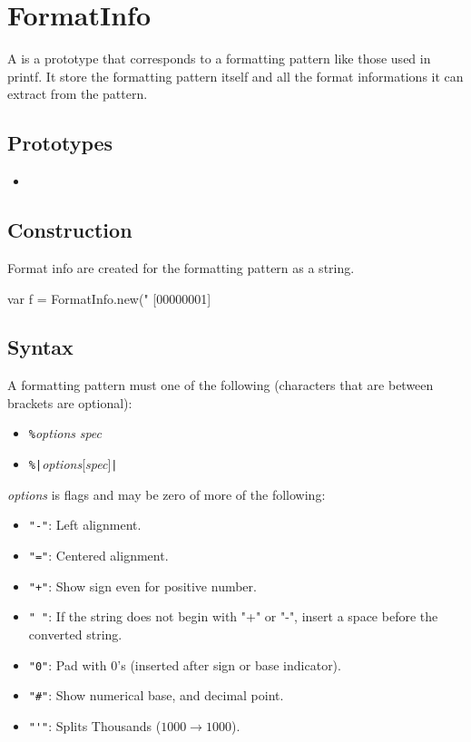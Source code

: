 \section{FormatInfo}

A  is a prototype that corresponds to a formatting
pattern like those used in printf. It store the formatting pattern
itself and all the format informations it can extract from the
pattern.

\subsection{Prototypes}

\begin{itemize}
\item {}
\end{itemize}

\subsection{Construction}

Format info are created for the formatting pattern as a string.

\begin{urbiscript}
var f = FormatInfo.new("%
[00000001] %
\end{urbiscript}

\subsection{Syntax}

A formatting pattern must one of the following (characters that are
between brackets are optional):

\begin{itemize}
\item \verb&%&\emph{options} \emph{spec}
\item \verb&%|&\emph{options}[\emph{spec}]\verb&|&
\end{itemize}

\emph{options} is flags and may be zero of more of the following:
\begin{itemize}
\item \verb&"-"&: Left alignment.
\item \verb&"="&: Centered alignment.
\item \verb&"+"&: Show sign even for positive number.
\item \verb&" "&: If the string does not begin with "+" or "-", insert a space before the converted string.
\item \verb&"0"&: Pad with 0's (inserted after sign or base indicator).
\item \verb&"#"&: Show numerical base, and decimal point.
\item \verb&"'"&: Splits Thousands ($1000 \rightarrow 1 000$).
\end{itemize}

